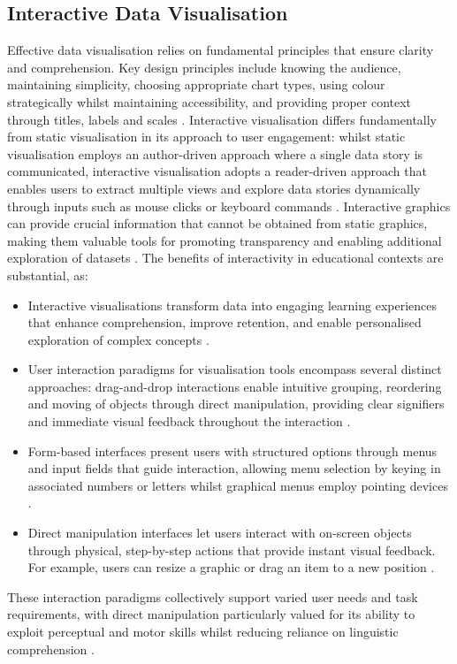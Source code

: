 \documentclass[12pt,nonacm,acmlarge,titlepage,screen]{acmart}
\begin{document}
\subsection{Interactive Data Visualisation} \label{sec:back_data_vis}
Effective data visualisation relies on fundamental principles that ensure clarity and comprehension. Key design principles include knowing the audience, maintaining simplicity, choosing appropriate chart types, using colour strategically whilst maintaining accessibility, and providing proper context through titles, labels and scales \cite{justinmind_dataviz_2025}. Interactive visualisation differs fundamentally from static visualisation in its approach to user engagement: whilst static visualisation employs an author-driven approach where a single data story is communicated, interactive visualisation adopts a reader-driven approach that enables users to extract multiple views and explore data stories dynamically through inputs such as mouse clicks or keyboard commands \cite{mahajan_comparative_2018}. Interactive graphics can provide crucial information that cannot be obtained from static graphics, making them valuable tools for promoting transparency and enabling additional exploration of datasets \cite{weissgerber_interactive_2016}. The benefits of interactivity in educational contexts are substantial, as:
\begin{itemize}
    \item Interactive visualisations transform data into engaging learning experiences that enhance comprehension, improve retention, and enable personalised exploration of complex concepts \cite{innovare_interactive_2025}. 
    \item User interaction paradigms for visualisation tools encompass several distinct approaches: drag-and-drop interactions enable intuitive grouping, reordering and moving of objects through direct manipulation, providing clear signifiers and immediate visual feedback throughout the interaction \cite{nngroup_dragdrop_2023}.
    \item Form-based interfaces present users with structured options through menus and input fields that guide interaction, allowing menu selection by keying in associated numbers or letters whilst graphical menus employ pointing devices \cite{methodist_interaction_paradigm}.
    \item Direct manipulation interfaces let users interact with on-screen objects through physical, step-by-step actions that provide instant visual feedback. For example, users can resize a graphic or drag an item to a new position \cite{shneiderman_directmanip_2024}.
\end{itemize}
These interaction paradigms collectively support varied user needs and task requirements, with direct manipulation particularly valued for its ability to exploit perceptual and motor skills whilst reducing reliance on linguistic comprehension \cite{shneiderman_directmanip_2024}.
\end{document}
